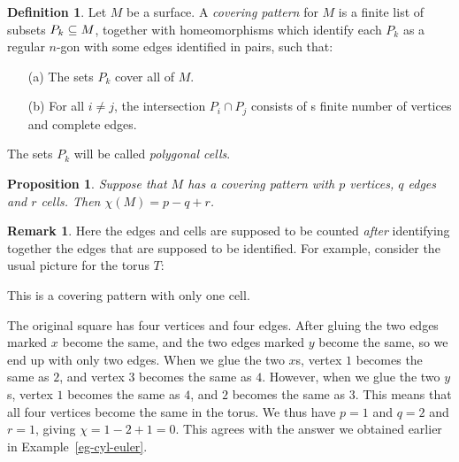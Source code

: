 \documentclass[reqno]{amsart}
\newtheorem{proposition}[theorem]{Proposition}
\theoremstyle{definition}
\newtheorem{remark}[theorem]{Remark}
\newtheorem{definition}[theorem]{Definition}
\begin{document}
\begin{definition}
 Let $M$ be a surface.  A \emph{covering pattern} for $M$ is a finite
 list of subsets $P_k\subseteq M$, together with homeomorphisms which
 identify each $P_k$ as a regular $n$-gon with some edges identified
 in pairs, such that:
 \begin{itemize}
  \item[(a)] The sets $P_k$ cover all of $M$.
  \item[(b)] For all $i\neq j$, the intersection $P_i\cap P_j$
   consists of s finite number of vertices and complete edges.
 \end{itemize}
 The sets $P_k$ will be called \emph{polygonal cells}.
\end{definition}

\begin{proposition}\label{prop-pattern}
 Suppose that $M$ has a covering pattern with $p$ vertices, $q$ edges
 and $r$ cells.  Then $\chi(M)=p-q+r$.
\end{proposition}

\begin{remark}
 Here the edges and cells are supposed to be counted \emph{after}
 identifying together the edges that are supposed to be identified.
 For example, consider the usual picture for the torus $T$:
 \begin{center}
 \end{center}
 This is a covering pattern with only one cell.

 The original square has four vertices and four edges.  After gluing
 the two edges marked $x$ become the same, and the two edges marked
 $y$ become the same, so we end up with only two edges.  When we glue
 the two $x$s, vertex $1$ becomes the same as $2$, and vertex $3$
 becomes the same as $4$.  However, when we glue the two $y$s, vertex
 $1$ becomes the same as $4$, and $2$ becomes the same as $3$.  This
 means that all four vertices become the same in the torus.  We thus
 have $p=1$ and $q=2$ and $r=1$, giving $\chi=1-2+1=0$.  This agrees
 with the answer we obtained earlier in Example~\ref{eg-cyl-euler}.
\end{remark}
\end{document}
